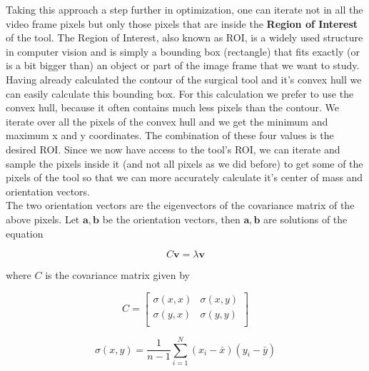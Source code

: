 Taking this approach a step further in optimization, one can iterate not in all the video frame pixels but only those pixels 
that are inside the \textbf{Region of Interest} of the tool. The Region of Interest, also known as ROI, is a widely used structure in computer vision and is simply a bounding box (rectangle) that fits exactly 
(or is a bit bigger than) an object or part of the image frame that we want to study. Having already calculated the contour of the surgical tool and it's convex hull we can easily calculate this bounding box. 
For this calculation we prefer to use the convex hull, because it often contains much less pixels than the contour. We iterate over all the pixels of the convex hull and we get the minimum and maximum x and y 
coordinates. The combination of these four values is the desired ROI. Since we now have access to the tool's ROI, we can iterate and sample the pixels inside it (and not all pixels as we did before) to get 
some of the pixels of the tool so that we can more accurately calculate it's center of mass and orientation vectors. \\

The two orientation vectors are the eigenvectors of the covariance matrix of the above pixels. Let $\mathbf{a},\mathbf{b}$ be the orientation vectors, 
then $\mathbf{a},\mathbf{b}$ are solutions of the equation

\begin{equation}
C \mathbf{v} = λ \mathbf{v}
\end{equation}

where $C$ is the covariance matrix given by

\begin{equation}
C = \begin{bmatrix}
σ(x,x) & σ(x,y) \\
σ(y,x) & σ(y,y) \\
\end{bmatrix}
\end{equation}

\begin{equation}
σ(x,y) = \frac{1}{n-1} \sum_{i=1}^{N} ( x_i - \bar{x} )( y_i - \bar{y} )
\end{equation}

